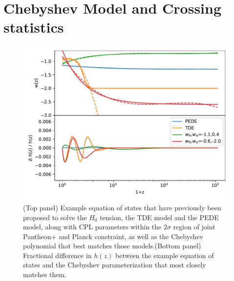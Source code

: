 \documentclass[
 reprint,
 amsmath,amssymb,
 aps,
]{revtex4-2}
\begin{document}
\section{Chebyshev Model and Crossing statistics}
\begin{figure}
    \centering
    \includegraphics[width=\columnwidth]{model_examples_delta_h_log1pz2.pdf}
    \caption{(Top panel) Example equation of states that have previously been proposed to solve the $H_0$ tension, the TDE model and the PEDE model, along with CPL parameters within the $2\sigma$ region of joint Pantheon+ and Planck constraint, as well as the Chebyshev polynomial that best matches those models.(Bottom panel) Fractional difference in $h(z)$ between the example equation of states and the Chebyshev parameterization that most closely matches them.}
    \label{fig:examples}
\end{figure}
\end{document}
